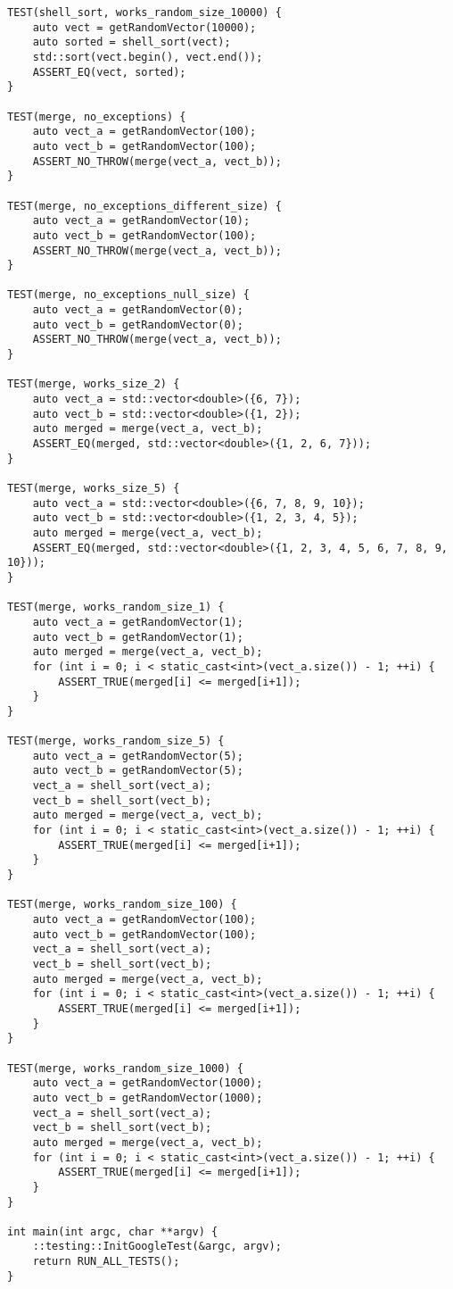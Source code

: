 \documentclass{report}
\begin{document}
\begin{lstlisting}
TEST(shell_sort, works_random_size_10000) {
    auto vect = getRandomVector(10000);
    auto sorted = shell_sort(vect);
    std::sort(vect.begin(), vect.end());
    ASSERT_EQ(vect, sorted);
}

TEST(merge, no_exceptions) {
    auto vect_a = getRandomVector(100);
    auto vect_b = getRandomVector(100);
    ASSERT_NO_THROW(merge(vect_a, vect_b));
}

TEST(merge, no_exceptions_different_size) {
    auto vect_a = getRandomVector(10);
    auto vect_b = getRandomVector(100);
    ASSERT_NO_THROW(merge(vect_a, vect_b));
}

TEST(merge, no_exceptions_null_size) {
    auto vect_a = getRandomVector(0);
    auto vect_b = getRandomVector(0);
    ASSERT_NO_THROW(merge(vect_a, vect_b));
}

TEST(merge, works_size_2) {
    auto vect_a = std::vector<double>({6, 7});
    auto vect_b = std::vector<double>({1, 2});
    auto merged = merge(vect_a, vect_b);
    ASSERT_EQ(merged, std::vector<double>({1, 2, 6, 7}));
}

TEST(merge, works_size_5) {
    auto vect_a = std::vector<double>({6, 7, 8, 9, 10});
    auto vect_b = std::vector<double>({1, 2, 3, 4, 5});
    auto merged = merge(vect_a, vect_b);
    ASSERT_EQ(merged, std::vector<double>({1, 2, 3, 4, 5, 6, 7, 8, 9, 10}));
}

TEST(merge, works_random_size_1) {
    auto vect_a = getRandomVector(1);
    auto vect_b = getRandomVector(1);
    auto merged = merge(vect_a, vect_b);
    for (int i = 0; i < static_cast<int>(vect_a.size()) - 1; ++i) {
        ASSERT_TRUE(merged[i] <= merged[i+1]);
    }
}

TEST(merge, works_random_size_5) {
    auto vect_a = getRandomVector(5);
    auto vect_b = getRandomVector(5);
    vect_a = shell_sort(vect_a);
    vect_b = shell_sort(vect_b);
    auto merged = merge(vect_a, vect_b);
    for (int i = 0; i < static_cast<int>(vect_a.size()) - 1; ++i) {
        ASSERT_TRUE(merged[i] <= merged[i+1]);
    }
}

TEST(merge, works_random_size_100) {
    auto vect_a = getRandomVector(100);
    auto vect_b = getRandomVector(100);
    vect_a = shell_sort(vect_a);
    vect_b = shell_sort(vect_b);
    auto merged = merge(vect_a, vect_b);
    for (int i = 0; i < static_cast<int>(vect_a.size()) - 1; ++i) {
        ASSERT_TRUE(merged[i] <= merged[i+1]);
    }
}

TEST(merge, works_random_size_1000) {
    auto vect_a = getRandomVector(1000);
    auto vect_b = getRandomVector(1000);
    vect_a = shell_sort(vect_a);
    vect_b = shell_sort(vect_b);
    auto merged = merge(vect_a, vect_b);
    for (int i = 0; i < static_cast<int>(vect_a.size()) - 1; ++i) {
        ASSERT_TRUE(merged[i] <= merged[i+1]);
    }
}

int main(int argc, char **argv) {
    ::testing::InitGoogleTest(&argc, argv);
    return RUN_ALL_TESTS();
}

\end{lstlisting}
\end{document}

